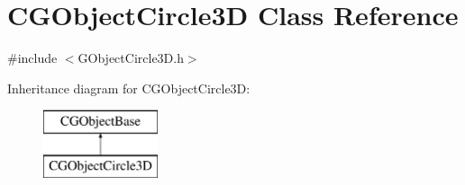 \hypertarget{class_c_g_object_circle3_d}{}\section{C\+G\+Object\+Circle3\+D Class Reference}
\label{class_c_g_object_circle3_d}


{\ttfamily \#include $<$G\+Object\+Circle3\+D.\+h$>$}

Inheritance diagram for C\+G\+Object\+Circle3\+D\+:\begin{figure}[H]
\begin{center}
\leavevmode
\includegraphics[height=2.000000cm]{class_c_g_object_circle3_d}
\end{center}
\end{figure}
